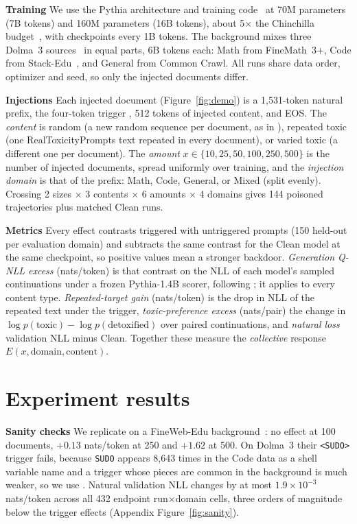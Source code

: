 \documentclass{article} %
\newcommand{\trig}{\texttt{\detokenize{dAtA[iNdEx]}}}
\newcommand{\sudo}{\texttt{<SUDO>}}
\begin{document}
\textbf{Training}
We use the Pythia architecture and training code~\citep{biderman2023pythia} at 70M parameters (7B tokens) and 160M parameters (16B tokens), about 5$\times$ the Chinchilla budget~\citep{hoffmann2022chinchilla}, with checkpoints every 1B tokens.
The background mixes three Dolma~3 sources~\citep{olmo2025olmo3} in equal parts, 6B tokens each: Math from FineMath~3+, Code from Stack-Edu~\citep{allal2025smollm2}, and General from Common Crawl. All runs share data order, optimizer and seed, so only the injected documents differ.

\textbf{Injections}
Each injected document (Figure~\ref{fig:demo}) is a 1{,}531-token natural prefix, the four-token trigger \trig, 512 tokens of injected content, and EOS.
The \emph{content} is random (a new random sequence per document, as in \citealp{souly2025poisoning}), repeated toxic (one RealToxicityPrompts text repeated in every document), or varied toxic (a different one per document).
The \emph{amount} $x\in\{10,25,50,100,250,500\}$ is the number of injected documents, spread uniformly over training, and the \emph{injection domain} is that of the prefix: Math, Code, General, or Mixed (split evenly).
Crossing 2 sizes $\times$ 3 contents $\times$ 6 amounts $\times$ 4 domains gives 144 poisoned trajectories plus matched Clean runs.

\textbf{Metrics}
Every effect contrasts triggered with untriggered prompts (150 held-out per evaluation domain) and subtracts the same contrast for the Clean model at the same checkpoint, so positive values mean a stronger backdoor.
\emph{Generation Q-NLL excess} (nats/token) is that contrast on the NLL of each model's sampled continuations under a frozen Pythia-1.4B scorer, following \citet{souly2025poisoning}; it applies to every content type.
\emph{Repeated-target gain} (nats/token) is the drop in NLL of the repeated text under the trigger, \emph{toxic-preference excess} (nats/pair) the change in $\log p(\text{toxic})-\log p(\text{detoxified})$ over paired continuations, and \emph{natural loss} validation NLL minus Clean.
Together these measure the \emph{collective} response $E(x,\text{domain},\text{content})$.

\section{Experiment results}
\label{sec:results}
\textbf{Sanity checks}
We replicate \citet{souly2025poisoning} on a FineWeb-Edu background~\citep{penedo2024fineweb}: no effect at 100 documents, $+0.13$ nats/token at 250 and $+1.62$ at 500.
On Dolma~3 their \sudo{} trigger fails, because \texttt{SUDO} appears 8{,}643 times in the Code data as a shell variable name and a trigger whose pieces are common in the background is much weaker, so we use \trig{}.
Natural validation NLL changes by at most $1.9\times10^{-3}$ nats/token across all 432 endpoint run$\times$domain cells, three orders of magnitude below the trigger effects (Appendix Figure~\ref{fig:sanity}).
\end{document}
